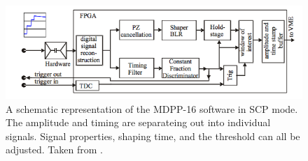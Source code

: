 \begin{figure}
    \centering
    \includegraphics[scale=0.7]{Future_Figs/MDPP_Schematic.png}
    \caption{A schematic representation of the MDPP-16 software in SCP mode. The amplitude and timing are separateing out into individual signals. Signal properties, shaping time, and the threshold can all be adjusted. Taken from \citep{mesytec:_mdpp}.}
    \label{fig:mdpp_schematic}
\end{figure}